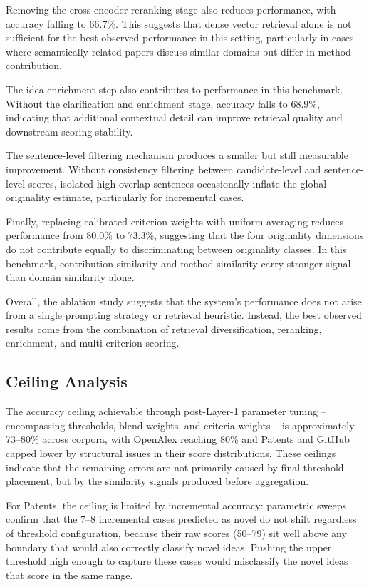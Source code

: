 Removing the cross-encoder reranking stage also reduces performance, with accuracy falling to 66.7\%. This suggests that dense vector retrieval alone is not sufficient for the best observed performance in this setting, particularly in cases where semantically related papers discuss similar domains but differ in method contribution.

The idea enrichment step also contributes to performance in this benchmark. Without the clarification and enrichment stage, accuracy falls to 68.9\%, indicating that additional contextual detail can improve retrieval quality and downstream scoring stability.

The sentence-level filtering mechanism produces a smaller but still measurable improvement. Without consistency filtering between candidate-level and sentence-level scores, isolated high-overlap sentences occasionally inflate the global originality estimate, particularly for incremental cases.

Finally, replacing calibrated criterion weights with uniform averaging reduces performance from 80.0\% to 73.3\%, suggesting that the four originality dimensions do not contribute equally to discriminating between originality classes. In this benchmark, contribution similarity and method similarity carry stronger signal than domain similarity alone.

Overall, the ablation study suggests that the system's performance does not arise from a single prompting strategy or retrieval heuristic. Instead, the best observed results come from the combination of retrieval diversification, reranking, enrichment, and multi-criterion scoring.
 
\subsection{Ceiling Analysis}
\label{sec:ceiling}
 
The accuracy ceiling achievable through post-Layer-1 parameter tuning -- encompassing thresholds, blend weights, and criteria weights -- is approximately 73--80\% across corpora, with OpenAlex reaching 80\% and Patents and GitHub capped lower by structural issues in their score distributions. These ceilings indicate that the remaining errors are not primarily caused by final threshold placement, but by the similarity signals produced before aggregation.
 
For Patents, the ceiling is limited by incremental accuracy: parametric sweeps confirm that the 7--8 incremental cases predicted as novel do not shift regardless of threshold configuration, because their raw scores (50--79) sit well above any boundary that would also correctly classify novel ideas. Pushing the upper threshold high enough to capture these cases would misclassify the novel ideas that score in the same range.
 
